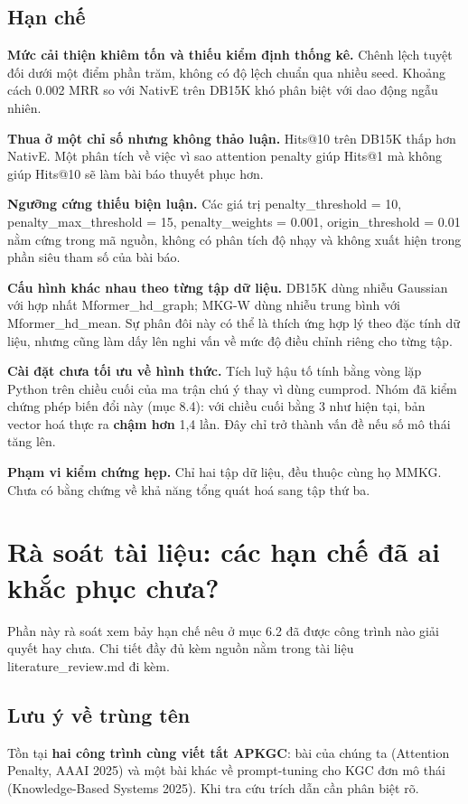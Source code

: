 \documentclass[11pt,a4paper]{article}
\newcommand{\code}[1]{{\ttfamily\small\color{codetext}#1}}
\begin{document}
\subsection{Hạn chế}
\textbf{Mức cải thiện khiêm tốn và thiếu kiểm định thống kê.} Chênh lệch tuyệt đối dưới một điểm phần trăm, không có độ lệch chuẩn qua nhiều seed. Khoảng cách 0.002 MRR so với NativE trên DB15K khó phân biệt với dao động ngẫu nhiên.

\textbf{Thua ở một chỉ số nhưng không thảo luận.} Hits@10 trên DB15K thấp hơn NativE. Một phân tích về việc vì sao attention penalty giúp Hits@1 mà không giúp Hits@10 sẽ làm bài báo thuyết phục hơn.

\textbf{Ngưỡng cứng thiếu biện luận.} Các giá trị \code{penalty\_threshold = 10}, \code{penalty\_max\_threshold = 15}, \code{penalty\_weights = 0.001}, \code{origin\_threshold = 0.01} nằm cứng trong mã nguồn, không có phân tích độ nhạy và không xuất hiện trong phần siêu tham số của bài báo.

\textbf{Cấu hình khác nhau theo từng tập dữ liệu.} DB15K dùng nhiễu Gaussian với hợp nhất \code{Mformer\_hd\_graph}; MKG-W dùng nhiễu trung bình với \code{Mformer\_hd\_mean}. Sự phân đôi này có thể là thích ứng hợp lý theo đặc tính dữ liệu, nhưng cũng làm dấy lên nghi vấn về mức độ điều chỉnh riêng cho từng tập.

\textbf{Cài đặt chưa tối ưu về hình thức.} Tích luỹ hậu tố tính bằng vòng lặp Python trên chiều cuối của ma trận chú ý thay vì dùng \code{cumprod}. Nhóm đã kiểm chứng phép biến đổi này (mục 8.4): với chiều cuối bằng 3 như hiện tại, bản vector hoá thực ra \textbf{chậm hơn} 1,4 lần. Đây chỉ trở thành vấn đề nếu số mô thái tăng lên.

\textbf{Phạm vi kiểm chứng hẹp.} Chỉ hai tập dữ liệu, đều thuộc cùng họ MMKG. Chưa có bằng chứng về khả năng tổng quát hoá sang tập thứ ba.

\section{Rà soát tài liệu: các hạn chế đã ai khắc phục chưa?}
Phần này rà soát xem bảy hạn chế nêu ở mục 6.2 đã được công trình nào giải quyết hay chưa. Chi tiết đầy đủ kèm nguồn nằm trong tài liệu \code{literature\_review.md} đi kèm.

\subsection{Lưu ý về trùng tên}
Tồn tại \textbf{hai công trình cùng viết tắt APKGC}: bài của chúng ta (Attention Penalty, AAAI 2025) và một bài khác về prompt-tuning cho KGC đơn mô thái (Knowledge-Based Systems 2025). Khi tra cứu trích dẫn cần phân biệt rõ.
\end{document}
